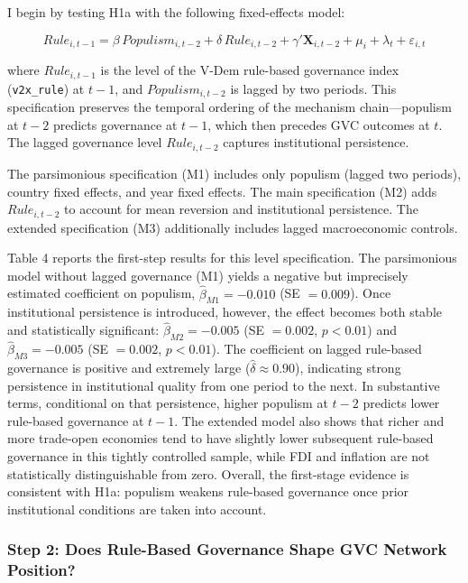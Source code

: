 \documentclass[12pt]{article}
\begin{document}
I begin by testing H1a with the following fixed-effects model:

\begin{equation}
\label{eq:step1}
Rule_{i,t-1} = \beta \, Populism_{i,t-2} + \delta \, Rule_{i,t-2} + \gamma' \mathbf{X}_{i,t-2} + \mu_i + \lambda_t + \varepsilon_{i,t}
\end{equation}

where $Rule_{i,t-1}$ is the level of the V-Dem rule-based governance index (\texttt{v2x\_rule}) at $t-1$, and $Populism_{i,t-2}$ is lagged by two periods. This specification preserves the temporal ordering of the mechanism chain---populism at $t-2$ predicts governance at $t-1$, which then precedes GVC outcomes at $t$. The lagged governance level $Rule_{i,t-2}$ captures institutional persistence.

The parsimonious specification (M1) includes only populism (lagged two periods), country fixed effects, and year fixed effects. The main specification (M2) adds $Rule_{i,t-2}$ to account for mean reversion and institutional persistence. The extended specification (M3) additionally includes lagged macroeconomic controls.

Table 4 reports the first-step results for this level specification. The parsimonious model without lagged governance (M1) yields a negative but imprecisely estimated coefficient on populism, $\hat{\beta}_{M1} = -0.010$ (SE $= 0.009$). Once institutional persistence is introduced, however, the effect becomes both stable and statistically significant: $\hat{\beta}_{M2} = -0.005$ (SE $= 0.002$, $p < 0.01$) and $\hat{\beta}_{M3} = -0.005$ (SE $= 0.002$, $p < 0.01$). The coefficient on lagged rule-based governance is positive and extremely large ($\hat{\delta} \approx 0.90$), indicating strong persistence in institutional quality from one period to the next. In substantive terms, conditional on that persistence, higher populism at $t-2$ predicts lower rule-based governance at $t-1$. The extended model also shows that richer and more trade-open economies tend to have slightly lower subsequent rule-based governance in this tightly controlled sample, while FDI and inflation are not statistically distinguishable from zero. Overall, the first-stage evidence is consistent with H1a: populism weakens rule-based governance once prior institutional conditions are taken into account.



\subsubsection*{Step 2: Does Rule-Based Governance Shape GVC Network Position?}
\end{document}
